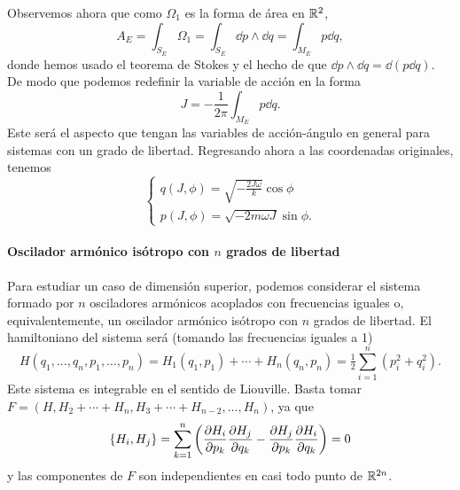   Observemos ahora que como $\Omega_1$ es la forma de área en $\mathbb{R}^2$, 
  \begin{equation*}
    A_E=\int_{S_E}\Omega_1 = \int_{S_E} \dd p \wedge \dd q = \int_{M_E}p\dd q,
\end{equation*}
donde hemos usado el teorema de Stokes y el hecho de que $\dd p \wedge \dd q= \dd(p\dd q)$. De modo que podemos redefinir la variable de acción en la forma
\begin{equation*}
  J=-\frac{1}{2\pi}\int_{M_E}p \dd q.
\end{equation*}
Este será el aspecto que tengan las variables de acción-ángulo en general para sistemas con un grado de libertad. Regresando ahora a las coordenadas originales, tenemos
\begin{equation*}
  \begin{cases}
    q(J,\phi)=\sqrt{-\frac{2J\omega}{ k}}\cos \phi\\
    p(J,\phi)=\sqrt{-2m\omega J}\sin \phi.
  \end{cases}
\end{equation*}

\paragraph{\bf Oscilador armónico isótropo con $n$ grados de libertad}\mbox{}

  Para estudiar un caso de dimensión superior, podemos considerar el sistema formado por $n$ osciladores armónicos acoplados con frecuencias iguales o, equivalentemente, un oscilador armónico isótropo con $n$ grados de libertad. El hamiltoniano del sistema será (tomando las frecuencias iguales a 1)
  \begin{equation*}
    H(q_1,\dots,q_n,p_1,\dots,p_n)= H_1(q_1,p_1)+ \cdots +H_n(q_n,p_n) = \tfrac{1}{2}\sum_{i=1}^n (p_i^2+q_i^2).
  \end{equation*}
  Este sistema es integrable en el sentido de Liouville. Basta tomar $F=(H,H_2+\cdots+H_{n},H_3+\cdots+H_{n-2},\dots,H_n)$, ya que 
  \begin{equation*}
    \left\lbrace H_i,H_j\right\rbrace = \sum_{k=1}^n\left( \frac{\partial H_i}{\partial p_k}\frac{\partial H_j}{\partial q_k} - \frac{\partial H_j}{\partial p_k}\frac{\partial H_i}{\partial q_k}\right)=0
  \end{equation*}
  y las componentes de $F$ son independientes en casi todo punto de $\mathbb{R}^{2n}$. 
  
